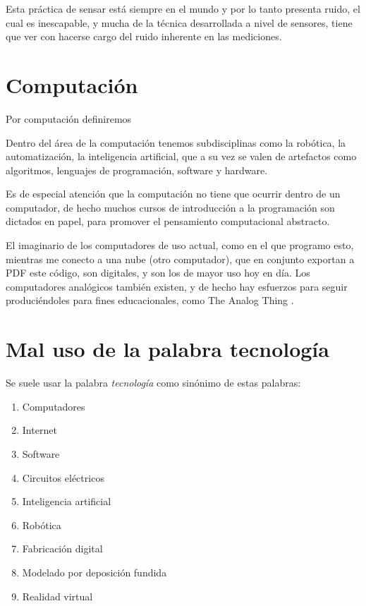 \documentclass{article}
\begin{document}
Esta práctica de sensar está siempre en el mundo y por lo tanto presenta ruido, el cual es inescapable, y mucha de la técnica desarrollada a nivel de sensores, tiene que ver con hacerse cargo del ruido inherente en las mediciones.

\clearpage

\section{Computación}

Por computación definiremos 

Dentro del área de la computación tenemos subdisciplinas como la robótica, la automatización, la  inteligencia artificial, que a su vez se valen de artefactos como algoritmos, lenguajes de programación, software y hardware.

Es de especial atención que la computación no tiene que ocurrir dentro de un computador, de hecho muchos cursos de introducción a la programación son dictados en papel, para promover el pensamiento computacional abstracto.

El imaginario de los computadores de uso actual, como en el que programo esto, mientras me conecto a una nube (otro computador), que en conjunto exportan a PDF este código, son digitales, y son los de mayor uso hoy en día. Los computadores analógicos también existen, y de hecho hay esfuerzos para seguir produciéndoles para fines educacionales, como The Analog Thing \cite{analogThing}.

\clearpage

\section{Mal uso de la palabra tecnología}

Se suele usar la palabra \textit{tecnología} como sinónimo de estas palabras:

\begin{enumerate}
    \item Computadores
    \item Internet
    \item Software
    \item Circuitos eléctricos
    \item Inteligencia artificial
    \item Robótica
    \item Fabricación digital
    \item Modelado por deposición fundida
    \item Realidad virtual
\end{enumerate}
\end{document}
